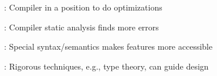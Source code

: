 \begin{citemize}
\item {}: Compiler in a position to do optimizations
\item {}: Compiler static analysis finds more errors
\item {}: Special syntax/semantics makes features more accessible
\item {}: Rigorous techniques, e.g., type theory, can guide design
\end{citemize}
\stopslide


\centerline{}
\stopslide


\centerline{}
\stopslide


